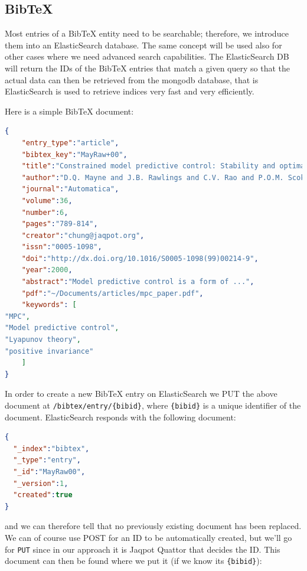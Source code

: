 \subsection{BibTeX}
Most entries of a BibTeX entity need to be searchable; 
therefore, we introduce them into an ElasticSearch database. 
The same concept will be used also for other cases where we need advanced 
search capabilities. The ElasticSearch DB will return the IDs of the 
BibTeX entries that match a given query so that the actual data can then 
be retrieved from the mongodb database, that is ElasticSearch is used to 
retrieve indices very fast and very efficiently. 

Here is a simple BibTeX document:

\begin{lstlisting}[language=json]
{
    "entry_type":"article",
    "bibtex_key":"MayRaw+00",
    "title":"Constrained model predictive control: Stability and optimality",
    "author":"D.Q. Mayne and J.B. Rawlings and C.V. Rao and P.O.M. Scokaert",
    "journal":"Automatica",
    "volume":36,
    "number":6,
    "pages":"789-814",
    "creator":"chung@jaqpot.org",
    "issn":"0005-1098",
    "doi":"http://dx.doi.org/10.1016/S0005-1098(99)00214-9",   
    "year":2000,
    "abstract":"Model predictive control is a form of ...",
    "pdf":"~/Documents/articles/mpc_paper.pdf",
    "keywords": [
"MPC", 
"Model predictive control",
"Lyapunov theory",
"positive invariance"
    ]
}
\end{lstlisting}
In order to create a new BibTeX entry on ElasticSearch we PUT the above document 
at \texttt{/bibtex/entry/\{bibid\}}, where \texttt{\{bibid\}} is a unique 
identifier of the document. ElasticSearch responds with the following document:
\begin{lstlisting}[language=json]
{
  "_index":"bibtex",
  "_type":"entry",
  "_id":"MayRaw00",
  "_version":1,
  "created":true
}
\end{lstlisting}
%
%
and we can therefore tell that no previously existing document has been replaced. 
We can of course use POST for an ID to be automatically created, but we'll go for 
\texttt{PUT} since in our approach it is Jaqpot Quattor that decides the ID. 
This document can then be found where we put it (if we know its \texttt{\{bibid\}}):

